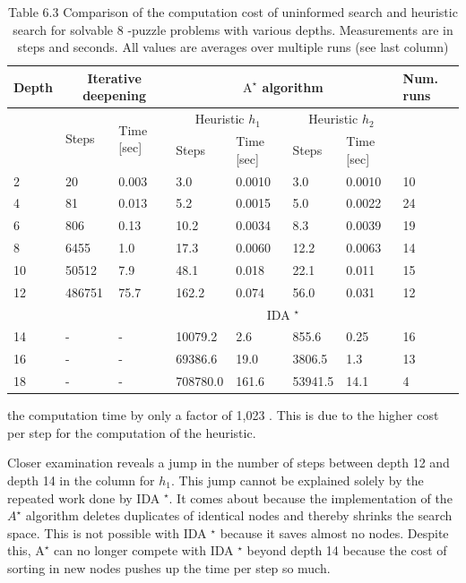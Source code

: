 \documentclass[10pt]{book}
\begin{document}
\begin{table}[htbp]
\begin{center}
\captionsetup{labelformat=empty}
\caption{Table 6.3 Comparison of the computation cost of uninformed search and heuristic search for solvable 8 -puzzle problems with various depths. Measurements are in steps and seconds. All values are averages over multiple runs (see last column)}
\begin{tabular}{|l|l|l|l|l|l|l|l|}
\hline
\multirow[t]{3}{*}{Depth} & \multicolumn{2}{|c|}{Iterative deepening} & \multicolumn{4}{|c|}{$\mathrm{A}^{\star}$ algorithm} & \multirow[t]{3}{*}{Num. runs} \\
\hline
 & \multirow[t]{2}{*}{Steps} & \multirow{2}{*}{Time [sec]} & \multicolumn{2}{|c|}{Heuristic $h_{1}$} & \multicolumn{2}{|c|}{Heuristic $h_{2}$} &  \\
\hline
 &  &  & Steps & Time [sec] & Steps & Time [sec] &  \\
\hline
2 & 20 & 0.003 & 3.0 & 0.0010 & 3.0 & 0.0010 & 10 \\
\hline
4 & 81 & 0.013 & 5.2 & 0.0015 & 5.0 & 0.0022 & 24 \\
\hline
6 & 806 & 0.13 & 10.2 & 0.0034 & 8.3 & 0.0039 & 19 \\
\hline
8 & 6455 & 1.0 & 17.3 & 0.0060 & 12.2 & 0.0063 & 14 \\
\hline
10 & 50512 & 7.9 & 48.1 & 0.018 & 22.1 & 0.011 & 15 \\
\hline
12 & 486751 & 75.7 & 162.2 & 0.074 & 56.0 & 0.031 & 12 \\
\hline
 &  &  & \multicolumn{4}{|c|}{IDA ${ }^{\star}$} &  \\
\hline
14 & - & - & 10079.2 & 2.6 & 855.6 & 0.25 & 16 \\
\hline
16 & - & - & 69386.6 & 19.0 & 3806.5 & 1.3 & 13 \\
\hline
18 & - & - & 708780.0 & 161.6 & 53941.5 & 14.1 & 4 \\
\hline
\end{tabular}
\end{center}
\end{table}

the computation time by only a factor of 1,023 . This is due to the higher cost per step for the computation of the heuristic.


Closer examination reveals a jump in the number of steps between depth 12 and depth 14 in the column for $h_{1}$. This jump cannot be explained solely by the repeated work done by IDA ${ }^{\star}$. It comes about because the implementation of the $A^{\star}$ algorithm deletes duplicates of identical nodes and thereby shrinks the search space. This is not possible with IDA ${ }^{\star}$ because it saves almost no nodes. Despite this, $\mathrm{A}^{\star}$ can no longer compete with IDA ${ }^{\star}$ beyond depth 14 because the cost of sorting in new nodes pushes up the time per step so much.
\end{document}
